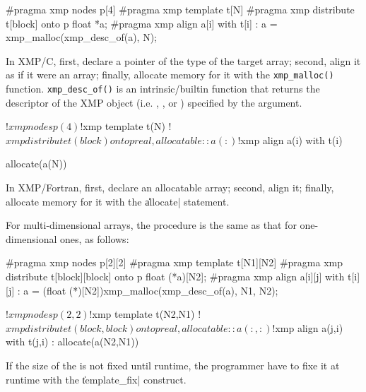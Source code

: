 \begin{XCexample}
#pragma xmp nodes p[4]
#pragma xmp template t[N]
#pragma xmp distribute t[block] onto p
float *a;
#pragma xmp align a[i] with t[i]
  :
a = xmp_malloc(xmp_desc_of(a), N);
\end{XCexample}

In XMP/C, first, declare a pointer of the type of the target array; 
%
second, align it as if it were an array;
%
finally, allocate memory for it with the {\tt xmp\_malloc()}
function. {\tt xmp\_desc\_of()} is an 
intrinsic/builtin function that returns the descriptor of the XMP object
(i.e. {\nodes}, {\templates}, or {\garrays}) specified by the argument.

\begin{XFexample}
!$xmp nodes p(4)
!$xmp template t(N)
!$xmp distribute t(block) onto p
real, allocatable :: a(:)
!$xmp align a(i) with t(i)

allocate(a(N))
\end{XFexample}

In XMP/Fortran, first, declare an allocatable array; second, align it;
finally, allocate memory for it with the \|allocate| statement.


For multi-dimensional arrays, the procedure is the same as that for 
one-dimensional ones, as follows:

\begin{XCexample}
#pragma xmp nodes p[2][2]
#pragma xmp template t[N1][N2]
#pragma xmp distribute t[block][block] onto p
float (*a)[N2];
#pragma xmp align a[i][j] with t[i][j]
  :
a = (float (*)[N2])xmp_malloc(xmp_desc_of(a), N1, N2);
\end{XCexample}

\begin{XFexample}
!$xmp nodes p(2,2)
!$xmp template t(N2,N1)
!$xmp distribute t(block,block) onto p
real, allocatable :: a(:,:)
!$xmp align a(j,i) with t(j,i)
  :
allocate(a(N2,N1))
\end{XFexample}

\begin{mynote}
  If the size of the {\template} is not fixed until runtime, the programmer
  have to fixe it at runtime with the \|template_fix| construct.
\end{mynote}



